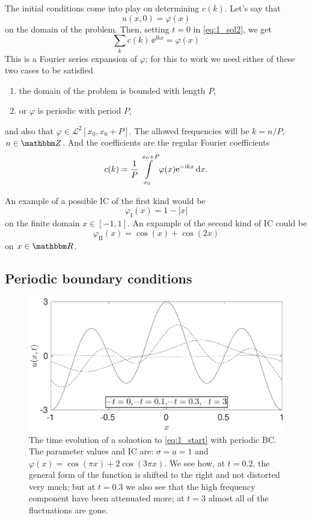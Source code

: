 \documentclass[11pt,letter, swedish, english
]{article}
\begin{document}
The initial conditions come into play on determining $c(k)$. Let's say
that
\begin{equation}
u(x, 0)=\varphi(x)
\end{equation}
on the domain of the problem. Then, setting $t=0$ in
\eqref{eq:1_sol2}, we get
\begin{equation}\label{eq:1_F-series}
\sum_k c(k)\, \ee^{\ii kx}=\varphi(x)
\end{equation}
This is a Fourier series expansion of $\varphi$; for this to work we
need  either of these two cases to be satisfied
\begin{enumerate}[label=\Roman*.]
\item the domain of the problem is bounded with length $P$,
\item or $\varphi$ is periodic with period $P$,
\end{enumerate}
and also that $\varphi\in\mathcal{L}^2[x_0, x_0+P]$.
The allowed frequencies will be $k=n/P$, $n\in\Z$.
And the coefficients are the regular Fourier coefficients
\begin{equation}
c(k)=\frac{1}{P}\int_{x_0}^{x_0+P} \varphi(x)\ee^{-\ii kx}\id{x}.
\end{equation}

An example of a possible IC of the first kind would be 
\begin{equation}
\varphi_\mathrm{I}(x)=1-|x|
\end{equation}
on the finite domain $x\in[-1, 1]$. An expample of the second kind of
IC could be
\begin{equation}
\varphi_\mathrm{II}(x)=\cos(x)+\cos(2x)
\end{equation}
on $x\in\R$.


\subsection{Periodic boundary conditions}
\begin{figure}\centering
\includegraphics[width=.8\textwidth]{1_time_evolution.eps}
\caption{The time evolution of a soluotion to \eqref{eq:1_start} with
  periodic BC. The parameter values and IC are: $\sigma=a=1$ and 
  $\varphi(x)=\cos(\pi x)+2\cos(3\pi x)$. We see how, at $t=0.2$, the
  general form of the function is shifted to the right and not
  distorted very much; but at $t=0.3$ we also see that the high
  frequency component have been attenuated more; at $t=3$ almost all
  of the fluctuations are gone.}
\label{fig:1}
\end{figure}
\end{document}
